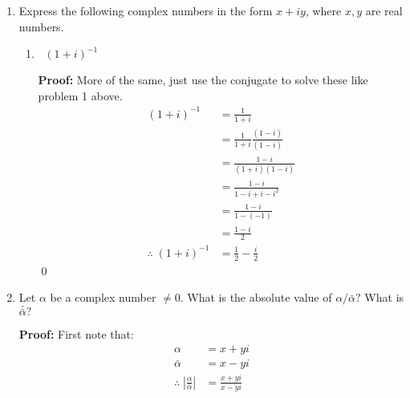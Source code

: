 \begin{enumerate}
\begin{enumerate}
		            \textbf{Proof:}
		            Distribute collect, distribute and collect again.
		            \begin{align*}
			            (i + 1)(i - 2)(i + 3) & = (i^2 -2i + i - 2)(i + 3) \\
			                                  & = (-i - 3)(i + 3)          \\
			                                  & = (1 - 3i - 3i - 9)        \\
			            \\
			            \therefore \; (i + 1)(i - 2)(i + 3)
			                                  & = -8 - 6i
		            \end{align*}
		            \qed
	      \end{enumerate}

	\item Express the following complex numbers in the form $x + iy$, where $x, y$ are real numbers.
	      \begin{enumerate}
		      \item $\;\;(1 + i)^{-1}$

		            \textbf{Proof:}
		            More of the same, just use the conjugate to solve these like problem 1 above.
		            \begin{align*}
			            (1 + i)^{-1} & = \frac{1}{1 + i}                         \\
			                         & = \frac{1}{1 + i} \frac{(1 - i)}{(1 - i)} \\
			                         & = \frac{1 - i}{(1 + i)(1 - i)}            \\
			                         & = \frac{1 - i}{1 - i + i - i^2}           \\
			                         & = \frac{1 - i}{1 - (-1)}                  \\
			                         & = \frac{1 - i}{2}                         \\
			            \therefore \; (1 + i)^{-1}
			                         & = \frac{1}{2} - \frac{i}{2}
		            \end{align*}
		            \qed
	      \end{enumerate}

	\item Let $\alpha$ be a complex number $\neq 0.$ What is the absolute value
	      of $\alpha/\bar{\alpha}?$ What is $\bar{\bar{\alpha}}?$

	      \textbf{Proof:}
	      First note that:
	      \begin{align*}
		      \alpha       & = x + yi                \\
		      \bar{\alpha} & = x - yi                \\
		      \therefore \; \left| \frac{\alpha}{\bar{\alpha}} \right|
		                   & = \frac{x + yi}{x - yi} \\
	      \end{align*}


\end{enumerate}
